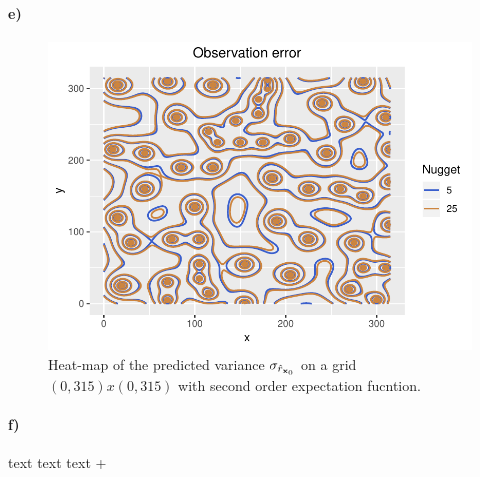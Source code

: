 \paragraph{e)}
\begin{figure}[htb]
    \centering
    \includegraphics{figures/nugget.pdf}
    \caption{Heat-map of the predicted variance $\sigma_{\hat{r}_{\boldsymbol{\mathbf{x}}_0}}$ on a grid $(0,315)x(0,315)$ with second order expectation fucntion.}
    \label{fig:nugget}
\end{figure}
\paragraph{f)}
text text text
+